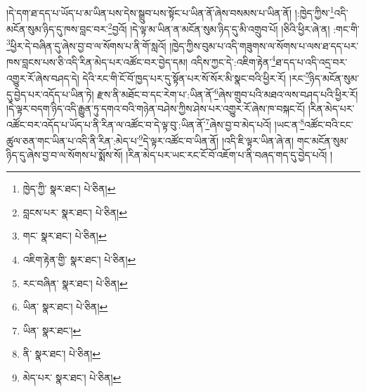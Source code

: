 །དེ་དག་ཐ་དད་པ་ཡོད་པ་མ་ཡིན་པས་དེས་སྒྲུབ་པས་སྟོང་པ་ཡིན་ནོ་ཞེས་བསམས་པ་ཡིན་ནོ། །:ཁྱེད་ཀྱིས་\footnote{ཁྱེད་ཀྱི་  སྣར་ཐང་།  པེ་ཅིན། }འདི་མངོན་སུམ་ཉིད་དུ་ཁས་བླང་བར་\footnote{བླངས་པར་  སྣར་ཐང་།  པེ་ཅིན། }བྱའོ། །དེ་ལྟ་མ་ཡིན་ན་མངོན་སུམ་ཉིད་དུ་མི་འགྲུབ་པོ། །ཅིའི་ཕྱིར་ཞེ་ན། :གང་གི་\footnote{གང་  སྣར་ཐང་།  པེ་ཅིན། }ཕྱིར་དེ་བཞིན་དུ་ཞེས་བྱ་བ་ལ་སོགས་པ་ནི་གོ་སླའོ། །ཁྱེད་ཀྱིས་བུམ་པ་འདི་གཟུགས་ལ་སོགས་པ་ལས་ཐ་དད་པར་ཁས་བླངས་པས་ཅི་འདི་རིན་མེད་པར་འཚོང་བར་བྱེད་དམ། འདིས་ཀྱང་དེ་:འཇིག་རྟེན་\footnote{འཇིག་རྟེན་གྱི་  སྣར་ཐང་།  པེ་ཅིན། }ཐ་དད་པ་འདི་འདྲ་བར་འགྱུར་རོ་ཞེས་བཤད་དེ། དེའི་རང་གི་ངོ་བོ་ཁྱད་པར་དུ་སྟོན་པར་སོ་སོར་མི་སྣང་བའི་ཕྱིར་རོ། །རང་\footnote{རང་བཞིན་  སྣར་ཐང་།  པེ་ཅིན། }ཉིད་མངོན་སུམ་དུ་བྱེད་པར་འདོད་པ་ཡིན་ཏེ། རྫས་ནི་མཐོང་བ་དང་རེག་པ་:ཡིན་ནོ་\footnote{ཡིན་  སྣར་ཐང་།  པེ་ཅིན། }ཞེས་གྲུབ་པའི་མཐའ་ལས་བཤད་པའི་ཕྱིར་རོ། །དེ་ལྟར་བདག་ཉིད་འདི་རྒྱུན་ཏུ་དགའ་བའི་གཉེན་བཤེས་ཀྱིས་ཤེས་པར་འགྱུར་རོ་ཞེས་ཁ་བསྐང་ངོ། །རིན་མེད་པར་འཚོང་བར་འདོད་པ་ཡོད་པ་ནི་རིན་ལ་འཚོང་བ་དེ་ལྟ་བུ་:ཡིན་ནོ་\footnote{ཡིན་  སྣར་ཐང་། }ཞེས་བྱ་བ་མེད་པའོ། །ཡང་ན་\footnote{ནི་  སྣར་ཐང་།  པེ་ཅིན། }འཚོང་བའི་ངང་ཚུལ་ཅན་གང་ཡིན་པ་འདི་ནི་རིན་:མེད་པ་\footnote{མེད་པར་  སྣར་ཐང་།  པེ་ཅིན། }དེ་ལྟར་འཚོང་བ་ཡིན་ནོ། །འདི་ཇི་ལྟར་ཡིན་ཞེ་ན། གང་མངོན་སུམ་ཉིད་དུ་ཞེས་བྱ་བ་ལ་སོགས་པ་སྨོས་སོ། །རིན་མེད་པར་ཡང་རང་ངོ་བོ་འཇོག་པ་ནི་བཞད་གད་དུ་བྱེད་པའོ། །
